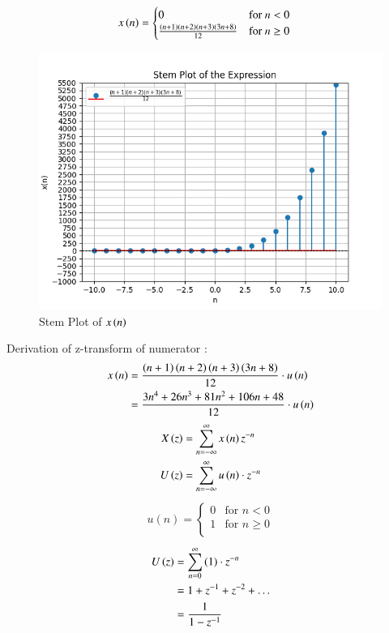 \documentclass[journal,12pt,twocolumn]{IEEEtran}
\theoremstyle{remark}
\begin{document}
\begin{enumerate}[label=\arabic*.]
\begin{align}
     x\left(n\right) & = \begin{cases}
        0 & \text{for } n < 0 \\
         \frac{\left(n+1\right)\left(n+2\right)\left(n+3\right)\left(3n+8\right)}{12}& \text{for } n \geq 0
    \end{cases}
\end{align}
\begin{figure}[h]
    \hspace{1cm}
    \includegraphics[width=1\columnwidth]{Figure_1.png}
    \caption{Stem Plot of $x\left(n\right)$}
\end{figure}
    
Derivation of z-transform of numerator :
\begin{align}
    x\left(n\right) &=  \frac{\left(n+1\right)\left(n+2\right)\left(n+3\right)\left(3n+8\right)}{12}\cdot u\left(n\right)\\
         &= \frac{3n^4 + 26n^3 + 81n^2 + 106n + 48}{12}\cdot u\left(n\right) \label{eq:11.9.5.26.1}
\end{align}
    \begin{align}
    X\left(z\right) &= \sum_{n=-\infty}^\infty x\left(n\right)z^{-n}\\
U\left(z\right) &= \sum_{n=-\infty}^{\infty} u\left(n\right)\cdot z^{-n} 
    \end{align}
\begin{align}
    u(n) = \begin{cases}
        0 & \text{for } n < 0 \\
        1 & \text{for } n \geq 0\\
    \end{cases}
\end{align}
\begin{align}
    U\left(z\right) &= \sum_{n=0}^{\infty} \left(1\right) \cdot z^{-n} \\
     &= 1 + z^{-1} + z^{-2} + \ldots \\
     &= \frac{1}{1 - z^{-1}} 
\end{align}


\end{enumerate}
\end{document}
